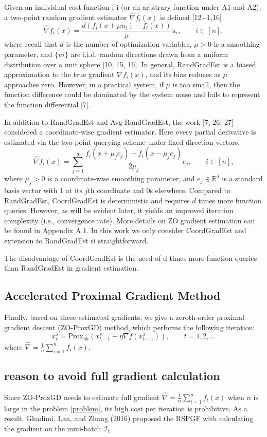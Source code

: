 \documentclass{article}
\newcommand*{\R}{\mathbb{R}}
\newcommand*{\Po}{\text{Prox}}
\theoremstyle{definition}
\theoremstyle{remark}
\begin{document}
{\color{Brown}
Given an individual cost function f i (or an arbitrary function under A1 and A2), a two-point random gradient estimator $\hat{\nabla} f_i(x)$ is defined [12+1,16]
\begin{equation}
\hat{\nabla} f_i(x) = \frac{d(f_i(x+\mu u_i) - f_i(x))}{\mu}u_i,\qquad i\in [n],
\end{equation}
where recall that $d$ is the number of optimization variables, $\mu > 0$ is a smoothing parameter, and
$\{u i\}$ are i.i.d. random directions drawn from a uniform distribution over a unit sphere [10, 15, 16]. In general, RandGradEst is a biased approximation to the true gradient $\nabla f_i(x)$, and its bias reduces as $\mu$ approaches zero. However, in a practical system, if $\mu$ is too small, then the function difference
could be dominated by the system noise and fails to represent the function differential [7].

In addition to RandGradEst and Avg-RandGradEst, the work [7, 26, 27] considered a coordinate-wise
gradient estimator. Here every partial derivative is estimated via the two-point querying scheme under fixed direction vectors,
\begin{equation}
\hat{\nabla} f_i(x) = \sum_{j=1}^d \frac{f_i(x+\mu_je_j) - f_i(x-\mu_je_j)}{2\mu_j}e_j,\qquad i\in [n],
\end{equation}
where $\mu_j > 0$ is a coordinate-wise smoothing parameter, and $e_j\in\R^d$ is a standard basis vector with 1 at its $j$th coordinate and $0$s elsewhere. Compared to RandGradEst, CoordGradEst is deterministic and requires $d$ times more function queries. However, as will be evident later, it yields an improved iteration complexity (i.e., convergence rate). More details on ZO gradient estimation can be found in Appendix A.1.
In this work we only consider CoordGradEst and extension to RandGradEst si straightforward. 
}

The disadvantage of CoordGradEst is the need of d times more function queries than RandGradEst in
gradient estimation.
\subsection{Accelerated Proximal Gradient Method}
{\color{Green}
Finally, based on these estimated gradients, we give a zeroth-order proximal gradient descent (ZO-ProxGD) method, which performs the following iteration:
\begin{equation}
x_{t}^s= \Po_{\eta h}(x_{t-1}^s - \eta \nabla f(x_{t-1}^s)),\qquad t=1, 2, \ldots
\end{equation}
where $\hat{\nabla}=\frac{1}{n}\sum_{i=1}^n f_i(x)$.
\subsection{reason to avoid full gradient calculation}
Since ZO-ProxGD needs to estimate full gradient
$\hat{\nabla}=\frac{1}{n}\sum_{i=1}^n f_i(x)$ when $n$ is large in the problem \eqref{problem}, its high cost per iteration is prohibitive. As a result, Ghadimi, Lan, and Zhang (2016) proposed the RSPGF with calculating the gradient on the mini-batch $\mathcal{I}_t$
}
\end{document}
